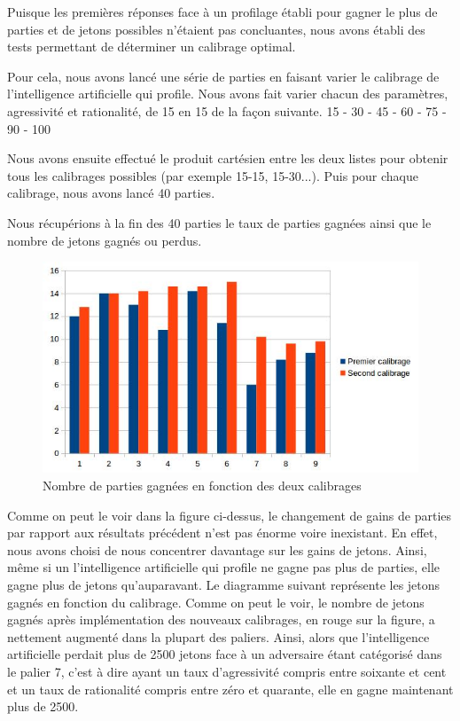 \documentclass{report}
\begin{document}
\hspace{0.5cm}Puisque les premières réponses face à un profilage établi pour gagner le plus de parties et de jetons possibles n'étaient pas concluantes, nous avons établi des tests permettant de déterminer un calibrage optimal.\par
Pour cela, nous avons lancé une série de parties en faisant varier le calibrage de l'intelligence artificielle qui profile. Nous avons fait varier chacun des paramètres, agressivité et rationalité, de 15 en 15 de la façon suivante.
15 - 30 - 45 - 60 - 75 - 90 - 100

Nous avons ensuite effectué le produit cartésien entre les deux listes pour obtenir tous les calibrages possibles (par exemple 15-15, 15-30...). Puis pour chaque calibrage, nous avons lancé 40 parties.\par

Nous récupérions à la fin des 40 parties le taux de parties gagnées ainsi que le nombre de jetons gagnés ou perdus.




\begin{figure}[H]
	\begin{center}
		\includegraphics[scale=0.5]{./imagesRapport/NombrePartiesGagneesEnFonctionCalibrage.jpg}
	\end{center}
	\caption{Nombre de parties gagnées en fonction des deux calibrages}
\end{figure}

Comme on peut le voir dans la figure ci-dessus, le changement de gains de parties par rapport aux résultats précédent n'est pas énorme voire inexistant. En effet, nous avons choisi de nous concentrer davantage sur les gains de jetons. Ainsi, même si un l'intelligence artificielle qui profile ne gagne pas plus de parties, elle gagne plus de jetons qu’auparavant. Le diagramme suivant représente les jetons gagnés en fonction du calibrage. Comme on peut le voir, le nombre de jetons gagnés après implémentation des nouveaux calibrages, en rouge sur la figure, a nettement augmenté dans la plupart des paliers. Ainsi, alors que l'intelligence artificielle perdait plus de 2500 jetons face à un adversaire étant catégorisé dans le palier 7, c'est à dire ayant un taux d'agressivité compris entre soixante et cent et un taux de rationalité compris entre zéro et quarante, elle en gagne maintenant plus de 2500.
\end{document}

